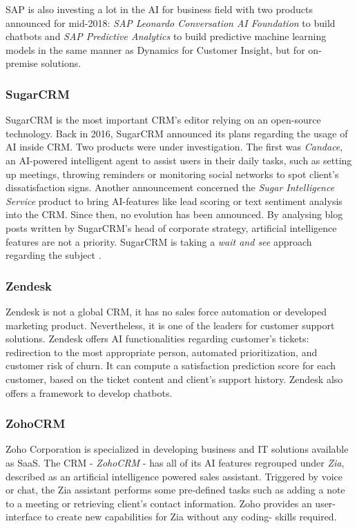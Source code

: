 SAP is also investing a lot in the AI for business field with two products announced for mid-2018: \textit{SAP Leonardo Conversation AI Foundation} to build chatbots and \textit{SAP Predictive Analytics} to build predictive machine learning models in the same manner as Dynamics for Customer Insight, but for on-premise solutions.


\subsubsection*{SugarCRM}
SugarCRM is the most important CRM's editor relying on an open-source technology. Back in 2016, SugarCRM announced its plans regarding the usage of AI inside CRM. Two products were under investigation. The first was \textit{Candace}, an AI-powered intelligent agent to assist users in their daily tasks, such as setting up meetings, throwing reminders or monitoring social networks to spot client's dissatisfaction signs. Another announcement concerned the \textit{Sugar Intelligence Service} product to bring AI-features like lead scoring or text sentiment analysis into the CRM. Since then, no evolution has been announced. By analysing blog posts written by SugarCRM's head of corporate strategy, artificial intelligence features are not a priority. SugarCRM is taking a \textit{wait and see} approach regarding the subject \cite{sugarcrm1,sugarcrm2}.

\subsubsection*{Zendesk}
Zendesk is not a global CRM, it has no sales force automation or developed marketing product. Nevertheless, it is one of the leaders for customer support solutions. Zendesk offers AI functionalities regarding customer's tickets: redirection to the most appropriate person, automated prioritization, and customer risk of churn. It can compute a satisfaction prediction score for each customer, based on the ticket content and client's support history. Zendesk also offers a framework to develop chatbots.

\subsubsection*{ZohoCRM}
Zoho Corporation is specialized in developing business and IT solutions available as SaaS. The CRM - \textit{ZohoCRM} - has all of its AI features regrouped under \textit{Zia}, described as an artificial intelligence powered sales assistant. Triggered by voice or chat, the Zia assistant performs some pre-defined tasks such as adding a note to a meeting or retrieving client's contact information. Zoho provides an user-interface to create new capabilities for Zia without any coding- skills required.

